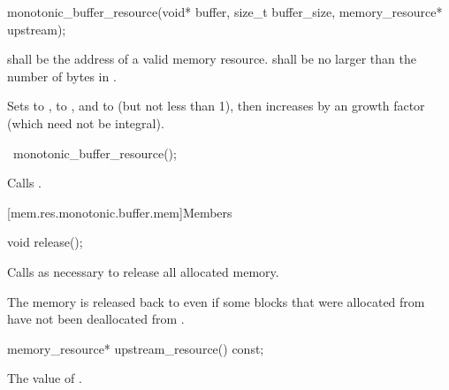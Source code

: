 %
\begin{itemdecl}
monotonic_buffer_resource(void* buffer, size_t buffer_size, memory_resource* upstream);
\end{itemdecl}

\begin{itemdescr}
\pnum
\requires
{} shall be the address of a valid memory resource.
 shall be no larger than the number of bytes in .

\pnum
\effects
Sets  to ,
 to , and
 to  (but not less than 1),
then increases 
by an  growth factor (which need not be integral).
\end{itemdescr}

%
\begin{itemdecl}
~monotonic_buffer_resource();
\end{itemdecl}

\begin{itemdescr}
\pnum
\effects
Calls .
\end{itemdescr}


[mem.res.monotonic.buffer.mem]{Members}

%
\begin{itemdecl}
void release();
\end{itemdecl}

\begin{itemdescr}
\pnum
\effects
Calls  as necessary
to release all allocated memory.

\pnum
\begin{note}
The memory is released back to 
even if some blocks that were allocated from 
have not been deallocated from .\end{note}
\end{itemdescr}

%
\begin{itemdecl}
memory_resource* upstream_resource() const;
\end{itemdecl}

\begin{itemdescr}
\pnum
\returns
The value of .
\end{itemdescr}

